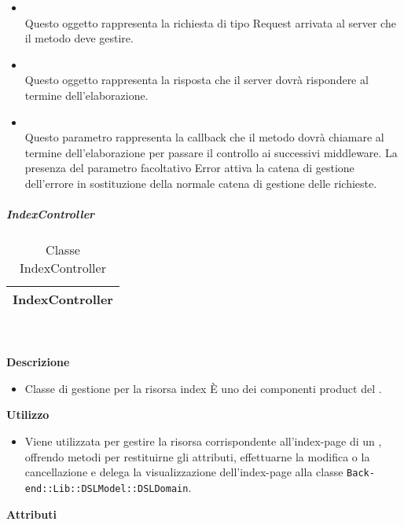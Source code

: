 \begin{itemize}
\begin{itemize}
						\item[]  \\ Questo oggetto rappresenta la richiesta di tipo Request arrivata al server che il metodo deve gestire.	
						\item[]  \\ Questo oggetto rappresenta la risposta che il server dovrà rispondere al termine dell'elaborazione.	
						\item[]  \\ Questo parametro rappresenta la callback che il metodo dovrà chiamare al termine dell'elaborazione per passare il controllo ai successivi middleware. La presenza del parametro facoltativo Error attiva la catena di gestione dell'errore in sostituzione della normale catena di gestione delle richieste.	
				\end{itemize}
		\end{itemize}
			\subparagraph{IndexController} 
\begin{table}[ht]
\begin{center}
\bgroup
	\setlength{\arrayrulewidth}{0.6mm}
	\def\arraystretch{1}
		\begin{tabular}{ | p{12cm} | }
				\hline  
					\centerline{\textbf{IndexController}}
		\\ \hline 
				\hline
				\hline
		
		\end{tabular}
\egroup
\caption{Classe IndexController}
\end{center}
\end{table}  \textbf{\\ \\ Descrizione} 
					\begin{itemize}
						\item[] Classe di gestione per la risorsa index 
È uno dei componenti product del  .

					\end{itemize}      
				\textbf{Utilizzo}  
					\begin{itemize}
						\item[] Viene utilizzata per gestire la risorsa corrispondente all'index-page di un , offrendo metodi per restituirne gli attributi, effettuarne la modifica o la cancellazione e delega la visualizzazione dell'index-page alla classe \texttt{Back-end::Lib::DSLModel::DSLDomain}.

					\end{itemize}
			 \textbf{Attributi} 
	\begin{itemize}
		\end{itemize}
		
